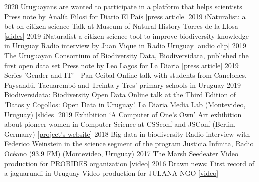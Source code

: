 \documentclass[9pt]{developercv} %
\begin{document}
\begin{entrylist}
	\entrylong
		{2020}
		{Uruguayans are wanted to participate in a platform that helps scientists}
		{}
		{Press note by Analía Filosi for Diario El País [\href{https://www.elpais.com.uy/vida-actual/busca-uruguayos-participen-plataforma-ayuda-cientificos.html}{press article}]}
	\entrylong
		{2019}
		{iNaturalist: a bet on citizen science}
		{}
		{Talk at Museum of Natural History Torres de la Llosa [\href{https://flograttarola.com/pdf/NaturalistaUy.pdf}{slides}]}
	\entrylong
		{2019}
		{iNaturalist a citizen science tool to improve biodiversity knowledge in Uruguay}
		{}
		{Radio interview by Juan Vique in Radio Uruguay [\href{https://sobreciencia.uy/inaturalist-una-apuesta-a-la-ciencia-ciudadana/}{audio clip}]}
	\entrylong
		{2019}
		{The Uruguayan Consortium of Biodiversity Data, Biodiversidata, published the first open data set}
		{}
		{Press note by Leo Lagos for La Diaria [\href{https://ladiaria.com.uy/ciencia/articulo/2019/7/el-consorcio-de-datos-de-biodiversidad-de-uruguay-biodiversidata-publico-el-primer-set-de-datos-abiertos/}{press article}]}
	\entrylong
		{2019}
		{Series 'Gender and IT' -  Pan Ceibal}
		{}
		{Online talk with students from Canelones, Paysandú, Tacuarembó and Treinta y Tres' primary schools in Uruguay}
	\entrylong
		{2019}
		{Biodiversidata: Biodiversity Open Data}
		{}
		{Online talk at the Third Edition of 'Datos y Cogollos: Open Data in Uruguay'. La Diaria Media Lab (Montevideo, Uruguay) [\href{https://flograttarola.com/talk/biodiversidata.-datos-abiertos-de-biodiversidad/Biodiversidata_Datos_y_Cogollos_OCT2019.pdf}{slides}]}
	\entrylong
		{2019}
		{Exhibition ‘A Computer of One’s Own’}
		{}
		{Art exhibition about pioneer women in Computer Science at CSSconf and JSConf (Berlin, Germany) [\href{https://medium.com/a-computer-of-ones-own}{project's website}]}
	\entrylong
		{2018}
		{Big data in biodiversity}
		{}
		{Radio interview with Federico Weinstein in the science segment of the program Justicia Infinita, Radio Océano (93.9 FM) (Montevideo, Uruguay)}
	\entrylong
		{2017}
		{The Marsh Seedeater}
		{}
		{Video production for PROBIDES organization [\href{https://youtu.be/EYKt83ShWQ8}{video}]}
	\entrylong
		{2016}
		{Drawn news: First record of a jaguarundi in Uruguay}
		{}
		{Video production for JULANA NGO [\href{https://youtu.be/Zva9m9hmXCc}{video}]}	
\end{entrylist}



\end{document}
